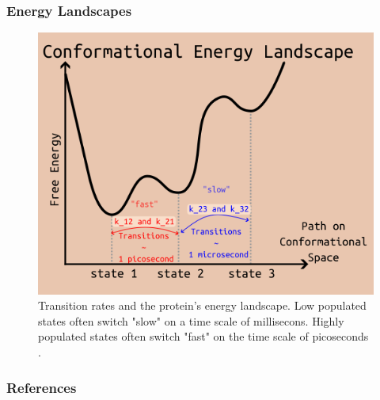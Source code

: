 \documentclass{beamer}
\begin{document}
\begin{frame}
\frametitle{Energy Landscapes}
\begin{figure}[h]
    \centering
    \includegraphics[scale=0.55]{energy-landscape.png}
    \caption{Transition rates and the protein's energy landscape.
        Low populated states often switch "slow" on a time scale of millisecons.
    Highly populated states often switch "fast" on the time scale of picoseconds \cite{bonomiDeterminationProteinStructural2019}. }
    \label{fig:min-bacteria}
\end{figure}

\end{frame}

\begin{frame}
\frametitle{References}
\printbibliography

\end{frame}
\end{document}
